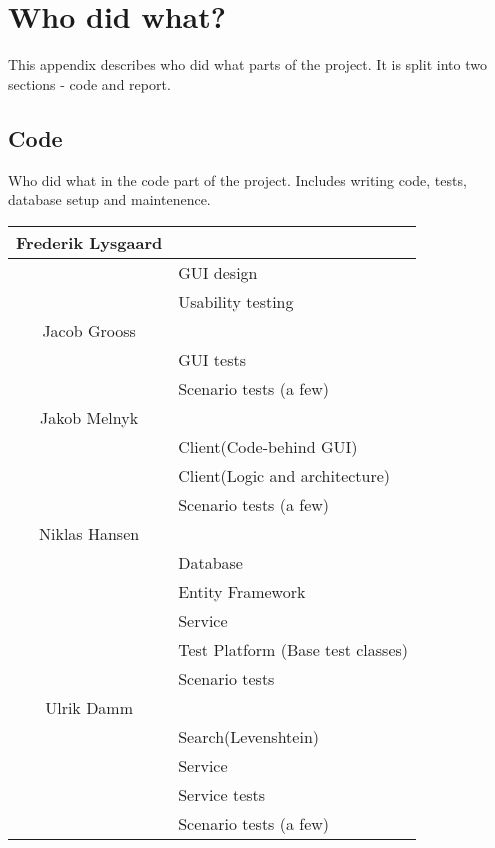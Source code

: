 \chapter{Who did what?}
\label{Appendix_Who}
This appendix describes who did what parts of the project. It is split into two sections - code and report.
\section{Code}
\label{Appendix_Who}
Who did what in the code part of the project. Includes writing code, tests, database setup and maintenence.
\begin{longtable}{| c | p{9cm} |}
\hline
Frederik Lysgaard & \\
\hline
& GUI design\\
\hline
& Usability testing\\
\hline
Jacob Grooss & \\
\hline
& GUI tests\\
\hline
& Scenario tests (a few)\\
\hline
Jakob Melnyk & \\
\hline
& Client(Code-behind GUI)\\
\hline
& Client(Logic and architecture)\\
\hline
& Scenario tests (a few)\\
\hline
Niklas Hansen & \\
\hline
& Database\\
\hline
& Entity Framework\\
\hline 
& Service\\
\hline
& Test Platform (Base test classes)\\
\hline
& Scenario tests\\
\hline
Ulrik Damm & \\
\hline
& Search(Levenshtein)\\
\hline
& Service\\
\hline
& Service tests\\
\hline
& Scenario tests (a few)\\
\hline
\end{longtable}

